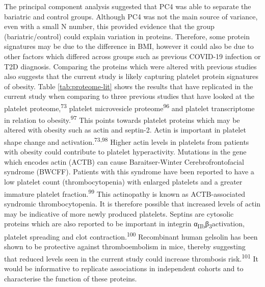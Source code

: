 \documentclass[11pt,twoside]{bristolthesis}
\begin{document}
The principal component analysis suggested that PC4 was able to separate the bariatric and control groups. Although PC4 was not the main source of variance, even with a small N number, this provided evidence that the group (bariatric/control) could explain variation in proteins. Therefore, some protein signatures may be due to the difference in BMI, however it could also be due to other factors which differed across groups such as previous COVID-19 infection or T2D diagnosis. Comparing the proteins which were altered with previous studies also suggests that the current study is likely capturing platelet protein signatures of obesity. Table \ref{tab:proteome-lit} shows the results that have replicated in the current study when comparing to three previous studies that have looked at the platelet proteome,\textsuperscript{73} platelet microvesicle proteome\textsuperscript{96} and platelet transcriptome in relation to obesity.\textsuperscript{97} This points towards platelet proteins which may be altered with obesity such as actin and septin-2. Actin is important in platelet shape change and activation.\textsuperscript{73,98} Higher actin levels in platelets from patients with obesity could contribute to platelet hyperactivity. Mutations in the gene which encodes actin (ACTB) can cause Baraitser-Winter Cerebrofrontofacial syndrome (BWCFF). Patients with this syndrome have been reported to have a low platelet count (thrombocytopenia) with enlarged platelets and a greater immature platelet fraction.\textsuperscript{99} This actinopathy is known as ACTB-associated syndromic thrombocytopenia. It is therefore possible that increased levels of actin may be indicative of more newly produced platelets. Septins are cytosolic proteins which are also reported to be important in integrin α\textsubscript{IIb}β\textsubscript{3}activation, platelet spreading and clot contraction.\textsuperscript{100} Recombinant human gelsolin has been shown to be protective against thromboembolism in mice, thereby suggesting that reduced levels seen in the current study could increase thrombosis risk.\textsuperscript{101} It would be informative to replicate associations in independent cohorts and to characterise the function of these proteins.
\end{document}
